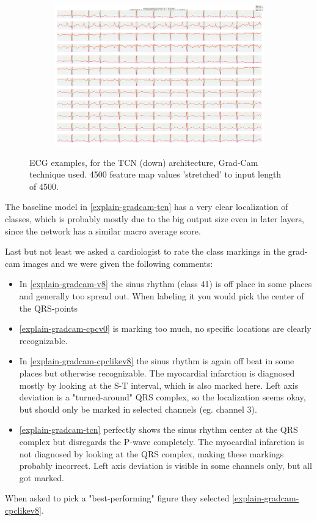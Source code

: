 \begin{figure}
	\begin{subfigure}{1\textwidth}\centering
		\includegraphics[width=\linewidth]{"bilder/HR07448-class:[4, 16, 33, 41]-gradient-camtcn.png"}
		\centering
	\end{subfigure}	
	\caption{ECG examples, for the TCN (down) architecture, Grad-Cam technique used. 4500 feature map values 'stretched' to input length of 4500.}
	\label{explain-gradcam-tcn}
\end{figure}
The  baseline model in \autoref{explain-gradcam-tcn} has a very clear localization of classes, which is probably mostly due to the big output size even in later layers, since the  network has a similar macro average score.


Last but not least we asked a cardiologist to rate the class markings in the grad-cam images and we were given the following comments:
\begin{itemize}
	\item In \autoref{explain-gradcam-v8} the sinus rhythm (class 41) is off place in some places and generally too spread out. When labeling it you would pick the center of the QRS-points
	\item \autoref{explain-gradcam-cpcv0} is marking too much, no specific locations are clearly recognizable.
	\item In \autoref{explain-gradcam-cpclikev8} the sinus rhythm is again off beat in some places but otherwise recognizable. The myocardial infarction is diagnosed mostly by looking at the S-T interval, which is also marked here. Left axis deviation is a "turned-around" QRS complex, so the localization seems okay, but should only be marked in selected channels (eg. channel 3).
	\item \autoref{explain-gradcam-tcn} perfectly shows the sinus rhythm center at the QRS complex but disregards the P-wave completely. The myocardial infarction is not diagnosed by looking at the QRS complex, making these markings probably incorrect. Left axis deviation is visible in some channels only, but all got marked.
\end{itemize}
When asked to pick a "best-performing" figure they selected \autoref{explain-gradcam-cpclikev8}. 

